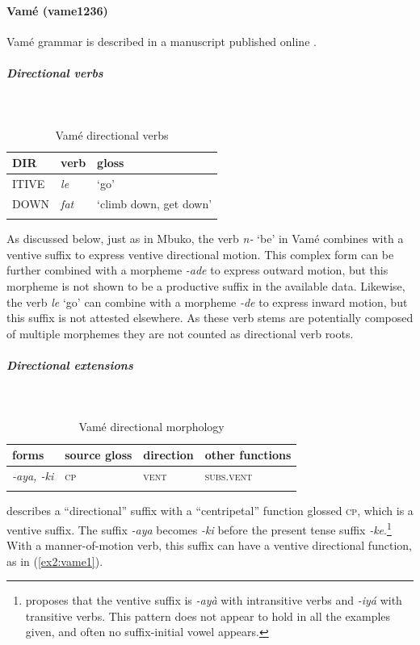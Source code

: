 \paragraph*{Vamé (vame1236)} \label{vame}

Vamé grammar is described in a manuscript published online \citep{kinnairdVameVerbalSystem2006}.

\subparagraph{Directional verbs}~

\begin{table}[H]
	\caption{Vamé directional verbs} 
	\label{tab:vameV}
	\begin{tabular}{lll} %
		\lsptoprule
		DIR & verb & gloss   \\ %
		\midrule
		ITIVE & \textit{le} & `go' \\
		DOWN & \textit{fat} & `climb down, get down' \\
		\lspbottomrule
	\end{tabular}
\end{table}

As discussed below, just as in Mbuko, the verb \textit{n-} `be' in Vamé combines with a ventive suffix to express ventive directional motion. This complex form can be further combined with a morpheme \textit{-ade} to express outward motion, but this morpheme is not shown to be a productive suffix in the available data. Likewise, the verb \textit{le} `go' can combine with a morpheme \textit{-de} to express inward motion, but this suffix is not attested elsewhere. As these verb stems are potentially composed of multiple morphemes they are not counted as directional verb roots. 

\subparagraph{Directional extensions}~

\begin{table}[H]
	\caption{Vamé directional morphology}
	\label{tab:vame}
	\begin{tabular}{llll} %
		\lsptoprule
		forms & source gloss & direction  & other functions  \\ %
		\midrule
		\textit{-aya, -ki}  &  \textsc{cp}  &   \textsc{vent} &   \textsc{subs.vent}  \\
		\lspbottomrule
	\end{tabular}
\end{table} 

\citet{kinnairdVameVerbalSystem2006} describes a ``directional'' suffix with a ``centripetal'' function glossed \textsc{cp}, which is a ventive suffix. The suffix \textit{-aya} becomes \textit{-ki} before the present tense suffix \textit{-ke}.\footnote{\citet[56]{kinnairdVameVerbalSystem2006} proposes that the ventive suffix is \textit{-ayà} with intransitive verbs and \textit{-iyá} with transitive verbs. This pattern does not appear to hold in all the examples given, and often no suffix-initial vowel appears.} With a manner-of-motion verb, this suffix can have a ventive directional function, as in (\ref{ex2:vame1}).

